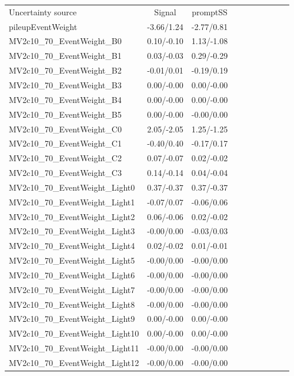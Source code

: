 \begin{table}[h]
\scriptsize
\begin{center}
\begin{tabular}{l|ccccccccc}
\hline
\hline
Uncertainty source &Signal &promptSS \\
pileupEventWeight &-3.66/1.24 &-2.77/0.81 \\
MV2c10\_70\_EventWeight\_B0 &0.10/-0.10 &1.13/-1.08 \\
MV2c10\_70\_EventWeight\_B1 &0.03/-0.03 &0.29/-0.29 \\
MV2c10\_70\_EventWeight\_B2 &-0.01/0.01 &-0.19/0.19 \\
MV2c10\_70\_EventWeight\_B3 &0.00/-0.00 &0.00/-0.00 \\
MV2c10\_70\_EventWeight\_B4 &0.00/-0.00 &0.00/-0.00 \\
MV2c10\_70\_EventWeight\_B5 &0.00/-0.00 &-0.00/0.00 \\
MV2c10\_70\_EventWeight\_C0 &2.05/-2.05 &1.25/-1.25 \\
MV2c10\_70\_EventWeight\_C1 &-0.40/0.40 &-0.17/0.17 \\
MV2c10\_70\_EventWeight\_C2 &0.07/-0.07 &0.02/-0.02 \\
MV2c10\_70\_EventWeight\_C3 &0.14/-0.14 &0.04/-0.04 \\
MV2c10\_70\_EventWeight\_Light0 &0.37/-0.37 &0.37/-0.37 \\
MV2c10\_70\_EventWeight\_Light1 &-0.07/0.07 &-0.06/0.06 \\
MV2c10\_70\_EventWeight\_Light2 &0.06/-0.06 &0.02/-0.02 \\
MV2c10\_70\_EventWeight\_Light3 &-0.00/0.00 &-0.03/0.03 \\
MV2c10\_70\_EventWeight\_Light4 &0.02/-0.02 &0.01/-0.01 \\
MV2c10\_70\_EventWeight\_Light5 &-0.00/0.00 &-0.00/0.00 \\
MV2c10\_70\_EventWeight\_Light6 &-0.00/0.00 &-0.00/0.00 \\
MV2c10\_70\_EventWeight\_Light7 &-0.00/0.00 &-0.00/0.00 \\
MV2c10\_70\_EventWeight\_Light8 &-0.00/0.00 &-0.00/0.00 \\
MV2c10\_70\_EventWeight\_Light9 &0.00/-0.00 &0.00/-0.00 \\
MV2c10\_70\_EventWeight\_Light10 &0.00/-0.00 &0.00/-0.00 \\
MV2c10\_70\_EventWeight\_Light11 &-0.00/0.00 &-0.00/0.00 \\
MV2c10\_70\_EventWeight\_Light12 &-0.00/0.00 &-0.00/0.00 \\

\end{tabular}
\end{center}
\end{table}
